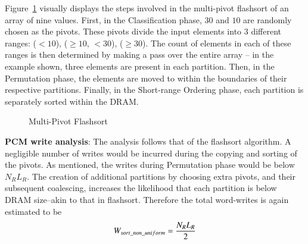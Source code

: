 

Figure~\ref{fig:mpsort} visually displays the steps involved in the multi-pivot
flashsort of an array of nine values. First, in the Classification phase, $30$
and $10$ are randomly chosen as the pivots. These pivots divide the input
elements into 3 different ranges: ($< 10$), ($\geq 10$, $< 30$), ($\geq 30$).
The count of elements in each of these ranges is then determined by making a
pass over the entire array -- in the example shown, three elements are present
in each partition.  Then, in the Permutation phase, the elements are moved to
within the boundaries of their respective partitions. Finally, in the
Short-range Ordering phase, each partition is separately sorted within the
DRAM.

\begin{figure}[h]
	\centering
	\hspace{0mm}
    \hspace{0mm}
	\caption{Multi-Pivot Flashsort}
	\label{fig:mpsort}
	
\end{figure}

\textbf{PCM write analysis}: The analysis follows that of the flashsort
algorithm. A negligible number of writes would be incurred during the copying and
sorting of the pivots. As mentioned, the writes during Permutation phase would 
be below $N_R L_R$. The creation of additional partitions by choosing extra
pivots, and their subsequent coalescing, increases the likelihood that each
partition is below DRAM size--akin to that in flashsort. Therefore
the total word-writes is again estimated to be \begin{equation}
\label{eq:mpivot} W_{sort\_non\_uniform} = \frac{N_RL_R}{2} \end{equation}
